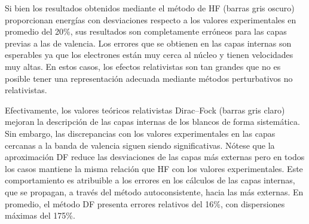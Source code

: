 Si bien los resultados obtenidos mediante el método de HF (barras gris 
oscuro) proporcionan energías con desviaciones respecto a los valores 
experimentales en promedio del 20\%, sus resultados son completamente 
erróneos para las capas previas a las de valencia. Los errores que se 
obtienen en las 
capas internas son esperables ya que los electrones están muy cerca al 
núcleo y tienen velocidades muy altas. En estos casos, los efectos 
relativistas son tan grandes que no es posible tener una representación 
adecuada mediante métodos perturbativos no relativistas. %


Efectivamente, los valores teóricos relativistas Dirac--Fock (barras 
gris claro) mejoran la descripción de las capas internas de los blancos 
de forma sistemática. Sin embargo, las discrepancias con los valores 
experimentales en las capas cercanas a la banda de valencia siguen 
siendo significativas. Nótese que la aproximación DF reduce las 
desviaciones de las capas más externas pero en todos los casos mantiene 
la misma relación que HF con los valores experimentales. Este 
comportamiento es atribuible a los errores en los cálculos de las capas 
internas, que se propagan, a través del método autoconsistente, 
hacia las más externas. En promedio, el método DF presenta errores 
relativos del 16\%, con dispersiones máximas del 175\%. 

